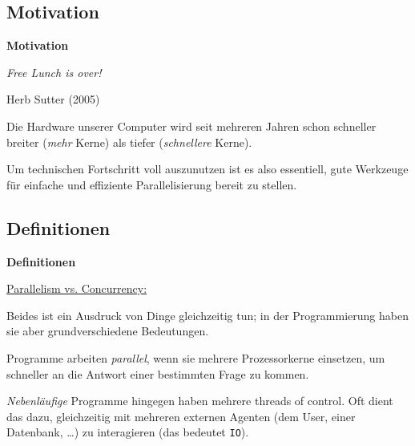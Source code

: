 \documentclass{beamer}
\begin{document}
\subsection{Motivation}


\begin{frame}[fragile]

\begin{center}
\Large
\textbf{Motivation}
\end{center}

\end{frame}


\begin{frame}[fragile]

\begin{center}
\huge
\emph{Free Lunch is over!}\bigskip

\normalsize
Herb Sutter (2005)
\end{center}
\pause
Die Hardware unserer Computer wird seit mehreren Jahren schon schneller breiter (\emph{mehr} Kerne) als tiefer (\emph{schnellere} Kerne).\pause\smallskip

Um technischen Fortschritt voll auszunutzen ist es also essentiell, gute Werkzeuge für einfache und effiziente Parallelisierung bereit zu stellen.
\end{frame}


\subsection{Definitionen}

\begin{frame}[fragile]

\begin{center}
\Large
\textbf{Definitionen}
\end{center}

\end{frame}


\begin{frame}
\underline{Parallelism vs. Concurrency:}\smallskip

Beides ist ein Ausdruck von \glqq Dinge gleichzeitig tun\grqq ; in der Programmierung haben sie aber grundverschiedene Bedeutungen.\pause\bigskip

Programme arbeiten \emph{parallel}, wenn sie mehrere Prozessorkerne einsetzen, um schneller an die Antwort einer bestimmten Frage zu kommen.\pause\bigskip

\emph{Nebenläufige} Programme hingegen haben mehrere \glqq threads of control\grqq . Oft dient das dazu, gleichzeitig mit mehreren externen Agenten (dem User, einer Datenbank, \dots) zu interagieren (das bedeutet \texttt{IO}).
\end{frame}
\end{document}
